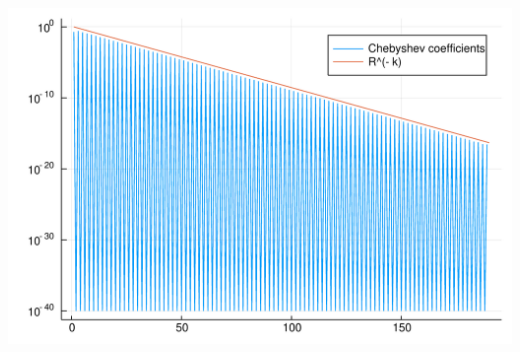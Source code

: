 \documentclass[12pt,a4paper]{article}
\begin{document}
\includegraphics[width=\linewidth]{figures/Lecture21_14_1.pdf}
\end{document}
